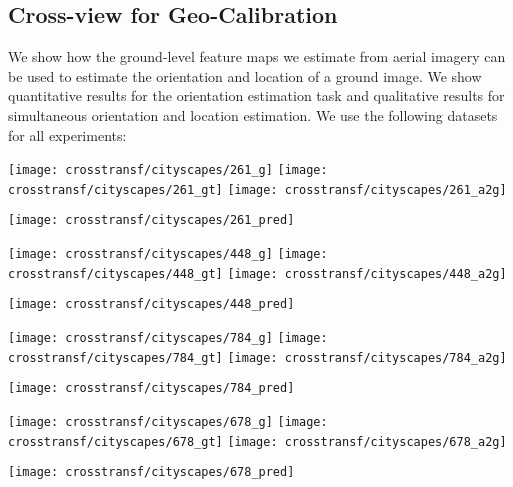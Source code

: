 \subsection{Cross-view for Geo-Calibration}


We show how the ground-level feature maps we estimate from aerial
imagery can be used to estimate the orientation and location of a
ground image.  We show quantitative results for the orientation
estimation task and qualitative results for simultaneous orientation
and location estimation. We use the following datasets for all
experiments:




\begin{figure*}
  \setlength{\aheight}{53.55pt}
  \setlength{\gwidth}{44.574pt}
  \centering

  \begin{minipage}[b]{\gwidth}
  \texttt{[image: crosstransf/cityscapes/261\_g]}
  \texttt{[image: crosstransf/cityscapes/261\_gt]}
  \texttt{[image: crosstransf/cityscapes/261\_a2g]}
  \end{minipage}
  \texttt{[image: crosstransf/cityscapes/261\_pred]}
  \hfill
  \begin{minipage}[b]{\gwidth}
  \texttt{[image: crosstransf/cityscapes/448\_g]}
  \texttt{[image: crosstransf/cityscapes/448\_gt]}
  \texttt{[image: crosstransf/cityscapes/448\_a2g]}
  \end{minipage}
  \texttt{[image: crosstransf/cityscapes/448\_pred]}
  \hfill
  \begin{minipage}[b]{\gwidth}
  \texttt{[image: crosstransf/cityscapes/784\_g]}
  \texttt{[image: crosstransf/cityscapes/784\_gt]}
  \texttt{[image: crosstransf/cityscapes/784\_a2g]}
  \end{minipage}
  \texttt{[image: crosstransf/cityscapes/784\_pred]}
  \hfill
  \begin{minipage}[b]{\gwidth}
  \texttt{[image: crosstransf/cityscapes/678\_g]}
  \texttt{[image: crosstransf/cityscapes/678\_gt]}
  \texttt{[image: crosstransf/cityscapes/678\_a2g]}
  \end{minipage}
  \texttt{[image: crosstransf/cityscapes/678\_pred]}


\end{figure*}
